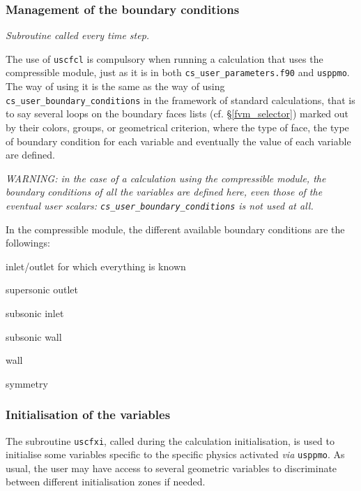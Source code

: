 {{{\subsubsection{Management of the boundary conditions}

\noindent
\textit{Subroutine called every time step.}

The use of \texttt{uscfcl}
is compulsory when running a calculation that uses the compressible module, just
as it is in both \texttt{cs\_user\_parameters.f90} and \texttt{usppmo}. The
way of using it is the same as the way of using
\texttt{cs\_user\_boundary\_conditions} in the framework of standard calculations, that is to
say several loops on the boundary faces lists (cf. \S\ref{fvm_selector})
marked out by their colors, groups, or  geometrical criterion, where
the type of face, the type of boundary condition for each variable and
eventually the value of each variable are defined.

{\em WARNING: in the case of a calculation using the compressible
module, the boundary conditions of all the variables are defined here,
even those of the eventual user scalars: {\em \texttt{cs\_user\_boundary\_conditions}} is not
used at all.}

In the compressible module, the different available boundary conditions
are the followings:

\begin{list}{-}{}
  \item inlet/outlet for which everything is known
  \item supersonic outlet
  \item subsonic inlet
  \item subsonic wall
  \item wall
  \item symmetry
\end{list}

\subsubsection{Initialisation of the variables}

The subroutine \texttt{uscfxi}, called during the calculation initialisation,
 is used to initialise some variables specific to the
specific physics activated {\em via} \texttt{usppmo}.  As usual,
the user may have access to several geometric variables to discriminate
between different initialisation zones if needed.

}}}
